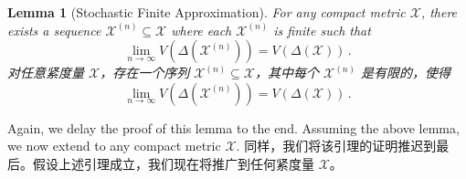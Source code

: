 \documentclass[12pt,letterpaper]{article}
\newenvironment{original}{\color{black}\noindent}{}
\newenvironment{translation}{\color{blue}\noindent}{}
\theoremstyle{plain}
\newtheorem{lemma}{Lemma}
\theoremstyle{definition}
\theoremstyle{remark}
\renewcommand{\1}{\mathds{1}}
\newcommand{\X}{\mathcal{X}}
\theoremstyle{definition}
\begin{document}
\begin{lemma}[Stochastic Finite Approximation]\label{lem:stoc-finite}
\begin{original}
For any compact metric $\X$, there exists a sequence $\X^{(n)} \subseteq \X$ where each $\X^{(n)}$ is finite such that
\[\lim_{n\rightarrow \infty}V(\Delta(\X^{(n)})) = V(\Delta(\X))\,.\]
\end{original}
\begin{translation}
对任意紧度量 $\X$，存在一个序列 $\X^{(n)} \subseteq \X$，其中每个 $\X^{(n)}$ 是有限的，使得
\[\lim_{n\rightarrow \infty}V(\Delta(\X^{(n)})) = V(\Delta(\X))\,.\]
\end{translation}
\end{lemma}

\begin{original}
Again, we delay the proof of this lemma to the end. Assuming the above lemma, we now extend  to any compact metric $\X$.
\end{original}
\begin{translation}
同样，我们将该引理的证明推迟到最后。假设上述引理成立，我们现在将推广到任何紧度量 $\X$。
\end{translation}
\end{document}
